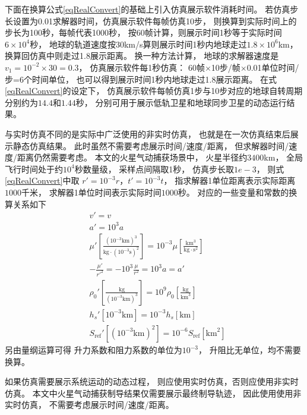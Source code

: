 下面在换算公式\eqref{eqRealConvert}的基础上引入仿真展示软件消耗时间。
若仿真步长设置为0.01求解器时间，仿真展示软件每帧仿真10步，
则换算到实际时间上的步长为100秒，每帧代表1000秒，
按60帧计算，则展示时间1秒等于实际时间$6\times10^4$秒，
地球的轨道速度按30km/s算则展示时间1秒内地球走过$1.8\times10^6$km，
换算回仿真中则走过1.8展示距离。
换一种方法计算，
地球的求解器速度是$v_1=10^{-2}\times30=0.3$，
仿真展示软件每1秒仿真：
60帧$\times$10步/帧$\times$0.01单位时间/步=6个时间单位，
也可以得到展示时间1秒内地球走过1.8展示距离。
在式\eqref{eqRealConvert}的设定下，
仿真展示软件每帧仿真1步与10步对应的地球自转周期分别约为$14.4$和$1.44$秒，
分别可用于展示低轨卫星和地球同步卫星的动态运行结果。

与实时仿真不同的是实际中广泛使用的非实时仿真，
也就是在一次仿真结束后展示静态仿真结果。
此时虽然不需要考虑展示时间/速度/距离，
但求解器时间/速度/距离仍然需要考虑。
本文的火星气动捕获场景中，
火星半径约$3400$km，
全局飞行时间处于约$10^4$秒数量级，
采样点间隔取1秒，
仿真步长取$1e-3$，
则式\eqref{eqRealConvert}中取
$r'=10^{-3}r$，$t'=10^{-3}t$，
指求解器1单位距离表示实际距离$1000$千米，
求解器1单位时间表示实际时间$1000$秒。
对应的一些变量和常数的换算关系如下
\begin{align*}
    &v' = v \\
    &a' = 10^3a \\
    &\mu'\left[\frac{(10^{-3}\text{km})^3}{\text{kg}\cdot(10^{-3}\text{s})^2}\right]
     = 10^{-3}\mu\left[\frac{\text{km}^3}{\text{kg}\cdot \text{s}^2}\right] \\
    &-\frac{\mu'}{r'^2} = -10^3\frac{\mu}{r^2} = 10^3a = a' \\
    &\rho_0'\left[\frac{\text{kg}}{(10^{-3}\text{km})^3}\right]
    = 10^9\rho_0\left[\frac{\text{kg}}{\text{km}^3}\right] \\
    &h_s'[10^{-3}\text{km}] = 10^{-3}h_s[\text{km}] \\
    &S_\text{ref}'[(10^{-3}\text{km})^2] = 10^{-6}S_\text{ref}[\text{km}^2]
\end{align*}
另由量纲运算可得
升力系数和阻力系数的单位为$10^{-3}$，
升阻比无单位，均不需要换算。

如果仿真需要展示系统运动的动态过程，
则应使用实时仿真，否则应使用非实时仿真。
本文中火星气动捕获制导结果仅需要展示最终制导轨迹，
因此使用使用非实时仿真，
不需要考虑展示时间/速度/距离。
